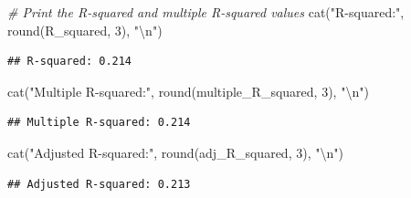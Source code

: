 \documentclass[
]{article}
\newenvironment{Shaded}{\begin{snugshade}}{\end{snugshade}}
\newcommand{\CommentTok}[1]{\textcolor[rgb]{0.56,0.35,0.01}{\textit{#1}}}
\newcommand{\DecValTok}[1]{\textcolor[rgb]{0.00,0.00,0.81}{#1}}
\newcommand{\FunctionTok}[1]{\textcolor[rgb]{0.00,0.00,0.00}{#1}}
\newcommand{\NormalTok}[1]{#1}
\newcommand{\SpecialCharTok}[1]{\textcolor[rgb]{0.00,0.00,0.00}{#1}}
\newcommand{\StringTok}[1]{\textcolor[rgb]{0.31,0.60,0.02}{#1}}
\begin{document}
\begin{Shaded}
\begin{Highlighting}[]
\CommentTok{\# Print the R{-}squared and multiple R{-}squared values}
\FunctionTok{cat}\NormalTok{(}\StringTok{"R{-}squared:"}\NormalTok{, }\FunctionTok{round}\NormalTok{(R\_squared, }\DecValTok{3}\NormalTok{), }\StringTok{"}\SpecialCharTok{\textbackslash{}n}\StringTok{"}\NormalTok{)}
\end{Highlighting}
\end{Shaded}

\begin{verbatim}
## R-squared: 0.214
\end{verbatim}

\begin{Shaded}
\begin{Highlighting}[]
\FunctionTok{cat}\NormalTok{(}\StringTok{"Multiple R{-}squared:"}\NormalTok{, }\FunctionTok{round}\NormalTok{(multiple\_R\_squared, }\DecValTok{3}\NormalTok{), }\StringTok{"}\SpecialCharTok{\textbackslash{}n}\StringTok{"}\NormalTok{)}
\end{Highlighting}
\end{Shaded}

\begin{verbatim}
## Multiple R-squared: 0.214
\end{verbatim}

\begin{Shaded}
\begin{Highlighting}[]
\FunctionTok{cat}\NormalTok{(}\StringTok{"Adjusted R{-}squared:"}\NormalTok{, }\FunctionTok{round}\NormalTok{(adj\_R\_squared, }\DecValTok{3}\NormalTok{), }\StringTok{"}\SpecialCharTok{\textbackslash{}n}\StringTok{"}\NormalTok{)}
\end{Highlighting}
\end{Shaded}

\begin{verbatim}
## Adjusted R-squared: 0.213
\end{verbatim}
\end{document}
